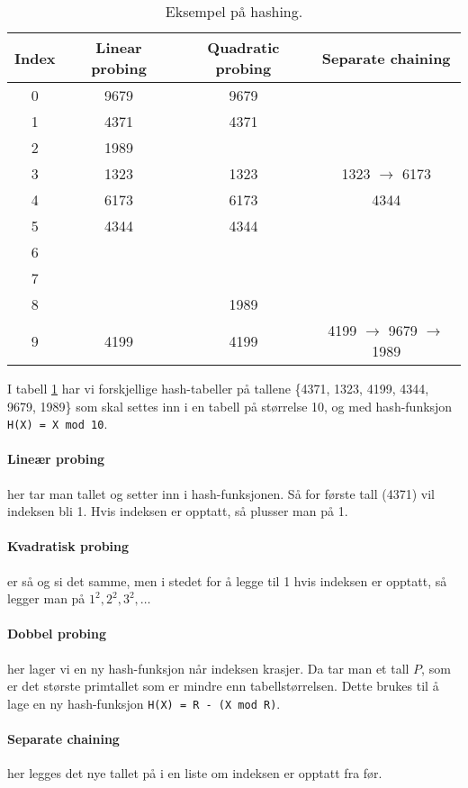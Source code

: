 \documentclass[11pt,a4paper]{article}
\theoremstyle{def}
\begin{document}
\begin{table}[h!]
\centering
\begin{tabular}{c|c|c|c}
Index & Linear probing & Quadratic probing & Separate chaining\\
\hline
0 & 9679 & 9679 &\\
1 & 4371 & 4371 & \\
2 & 1989 & &\\
3 & 1323 & 1323 & 1323 $\rightarrow$ 6173\\
4 & 6173 & 6173 & 4344\\
5 & 4344 & 4344 &\\
6 & & &\\
7 & & &\\
8 & & 1989 &\\
9 & 4199 & 4199 & 4199 $\rightarrow$ 9679 $\rightarrow$ 1989\\
\end{tabular}
\label{tab:hash}
\caption{Eksempel på hashing.}
\end{table}
I tabell \ref{tab:hash} har vi forskjellige hash-tabeller på tallene \{4371, 1323, 4199, 4344, 9679, 1989\} som skal settes inn i en tabell på størrelse 10, og med hash-funksjon \texttt{H(X) = X mod 10}.

\paragraph{Lineær probing} her tar man tallet og setter inn i hash-funksjonen. Så for første tall (4371) vil indeksen bli 1. Hvis indeksen er opptatt, så plusser man på 1.

\paragraph{Kvadratisk probing} er så og si det samme, men i stedet for å legge til 1 hvis indeksen er opptatt, så legger man på $1^2, 2^2, 3^2,\dots$

\paragraph{Dobbel probing} her lager vi en ny hash-funksjon når indeksen krasjer. Da tar man et tall $P$, som er det største primtallet som er mindre enn tabellstørrelsen. Dette brukes til å lage en ny hash-funksjon \texttt{H(X) = R - (X mod R)}.

\paragraph{Separate chaining} her legges det nye tallet på i en liste om indeksen er opptatt fra før.
\end{document}
